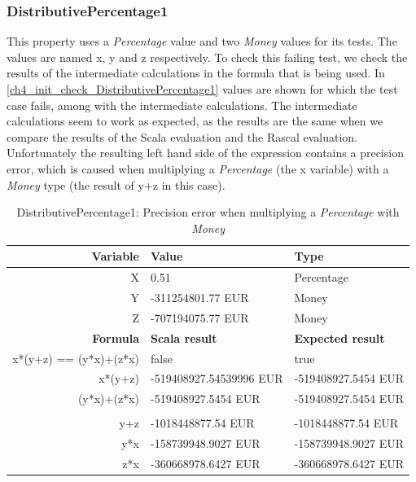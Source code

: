 \subsubsection{DistributivePercentage1}
\label{ssct:ch5_distributivePercentage1}
This property uses a \textit{Percentage} value and two \textit{Money} values for its tests. The values are named x, y and z respectively. To check this failing test, we check the results of the intermediate calculations in the formula that is being used. In \autoref{ch4_init_check_DistributivePercentage1} values are shown for which the test case fails, among with the intermediate calculations. The intermediate calculations seem to work as expected, as the results are the same when we compare the results of the Scala evaluation and the Rascal evaluation. Unfortunately the resulting left hand side of the expression contains a precision error, which is caused when multiplying a \textit{Percentage} (the x variable) with a \textit{Money} type (the result of y+z in this case).
\FloatBarrier
\begin{table}[!ht]
\centering
\begin{tabular}{rll}
\hline
\textbf{Variable}      & \textbf{Value}          & \textbf{Type}            \\ \hline
X                      & 0.51                    & Percentage               \\
Y                      & -311254801.77 EUR       & Money                    \\
Z                      & -707194075.77 EUR       & Money                    \\ \hline
\textbf{Formula}       & \textbf{Scala result}   & \textbf{Expected result} \\ \hline
x*(y+z) == (y*x)+(z*x) & false                   & true                     \\
x*(y+z)                & -519408927.54539996 EUR & -519408927.5454 EUR      \\
(y*x)+(z*x)            & -519408927.5454 EUR     & -519408927.5454 EUR      \\
                       &                         &                          \\
y+z                    & -1018448877.54 EUR      & -1018448877.54 EUR       \\
y*x                    & -158739948.9027 EUR     & -158739948.9027 EUR      \\
z*x                    & -360668978.6427 EUR     & -360668978.6427 EUR      \\ \hline
\end{tabular}
\caption{DistributivePercentage1: Precision error when multiplying a \textit{Percentage} with \textit{Money}}
\label{ch4_init_check_DistributivePercentage1}
\end{table}
\FloatBarrier

